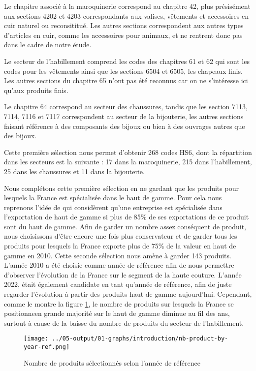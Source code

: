 \documentclass[french,10pt,a4paper]{article}
\begin{document}
Le chapitre associé à la maroquinerie correspond au chapitre 42, plus présisément aux sections 4202 et 4203 correspondants aux valises, vêtements et accessoires en cuir naturel ou reconsititué. Les autres sections correspondent aux autres types d'articles en cuir, comme les accessoires pour animaux, et ne rentrent donc pas dans le cadre de notre étude.

Le secteur de l'habillement comprend les codes des chapitres 61 et 62 qui sont les codes pour les vêtements ainsi que les sections 6504 et 6505, les chapeaux finis. Les autres sections du chapitre 65 n'ont pas été reconnus car on ne s'intéresse ici qu'aux produits finis.

Le chapitre 64 correspond au secteur des chaussures, tandis que les section 7113, 7114, 7116 et 7117 correspondent au secteur de la bijouterie, les autres sections faisant référence à des composants des bijoux ou bien à des ouvrages autres que des bijoux.

Cette première sélection nous permet d'obtenir 268 codes HS6, dont la répartition dans les secteurs est la suivante : 17 dans la maroquinerie, 215 dans l'habillement, 25 dans les chaussures et 11 dans la bijouterie.

\medskip

Nous complétons cette première sélection en ne gardant que les produits pour lesquels la France est spécialisée dans le haut de gamme. Pour cela nous reprenons l'idée de \cite{Martin2015} qui considèrent qu'une entreprise est spécialisée dans l'exportation de haut de gamme si plus de 85\% de ses exportations de ce produit sont du haut de gamme. Afin de garder un nombre assez conséquent de produit, nous choisissons d'être encore une fois plus conservateur et de garder tous les produits pour lesquels la France exporte plus de 75\% de la valeur en haut de gamme en 2010. Cette seconde sélection nous amène à garder 143 produits. L'année 2010 a été choisie comme année de référence afin de nous permettre d'observer l'évolution de la France sur le segment de la haute couture. L'année 2022, était également candidate en tant qu'année de référence, afin de juste regarder l'évolution à partir des produits haut de gamme aujourd'hui. Cependant, comme le montre la figure \ref{fig:nb-product-by-year-ref}, le nombre de produits sur lesquels la France se positionneen grande majorité sur le haut de gamme diminue au fil des ans, surtout à cause de la baisse du nombre de produits du secteur de l'habillement. 

\begin{figure}[!h]
  \centering \texttt{[image: ../05-output/01-graphs/introduction/nb-product-by-year-ref.png]}
  \caption{Nombre de produits sélectionnés selon l'année de référence}
  \label{fig:nb-product-by-year-ref}
\end{figure}
\end{document}
